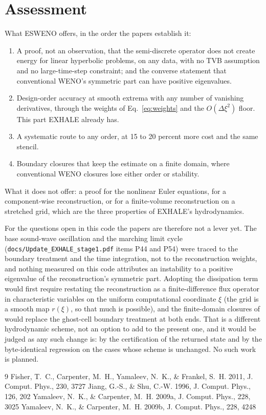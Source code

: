 \documentclass[english,a4paper]{my_memo}
\begin{document}
\section{Assessment}

What ESWENO offers, in the order the papers establish it:
\begin{enumerate}
\item A proof, not an observation, that the semi-discrete operator does not
  create energy for linear hyperbolic problems, on any data, with no TVB
  assumption and no large-time-step constraint; and the converse statement
  that conventional WENO's symmetric part can have positive eigenvalues.
\item Design-order accuracy at smooth extrema with any number of vanishing
  derivatives, through the weights of Eq.~\eqref{eq:weights} and the
  $O(\Delta\xi^2)$ floor. This part EXHALE already has.
\item A systematic route to any order, at 15 to 20 percent more cost and the
  same stencil.
\item Boundary closures that keep the estimate on a finite domain, where
  conventional WENO closures lose either order or stability.
\end{enumerate}
What it does not offer: a proof for the nonlinear Euler equations, for a
component-wise reconstruction, or for a finite-volume reconstruction on a
stretched grid, which are the three properties of EXHALE's hydrodynamics.

For the questions open in this code the papers are therefore not a lever
yet. The base sound-wave oscillation and the marching limit cycle
(\texttt{docs/Update\_EXHALE\_stage1.pdf} items P44 and P54) were traced to
the boundary treatment and the time integration, not to the reconstruction
weights, and nothing measured on this code attributes an instability to a
positive eigenvalue of the reconstruction's symmetric part. Adopting the
dissipation term would first require restating the reconstruction as a
finite-difference flux operator in characteristic variables on the uniform
computational coordinate $\xi$ (the grid is a smooth map $r(\xi)$, so that
much is possible), and the finite-domain closures of \citet{Fisher2011}
would replace the ghost-cell boundary treatment at both ends. That is a
different hydrodynamic scheme, not an option to add to the present one, and
it would be judged as any such change is: by the certification of the
returned state and by the byte-identical regression on the cases whose
scheme is unchanged. No such work is planned.

\begin{thebibliography}{9}
Fisher, T.~C., Carpenter, M.~H., Yamaleev, N.~K., \& Frankel, S.~H. 2011,
J. Comput. Phys., 230, 3727
Jiang, G.-S., \& Shu, C.-W. 1996, J. Comput. Phys., 126, 202
Yamaleev, N.~K., \& Carpenter, M.~H. 2009a, J. Comput. Phys., 228, 3025
Yamaleev, N.~K., \& Carpenter, M.~H. 2009b, J. Comput. Phys., 228, 4248
\end{thebibliography}
\end{document}
